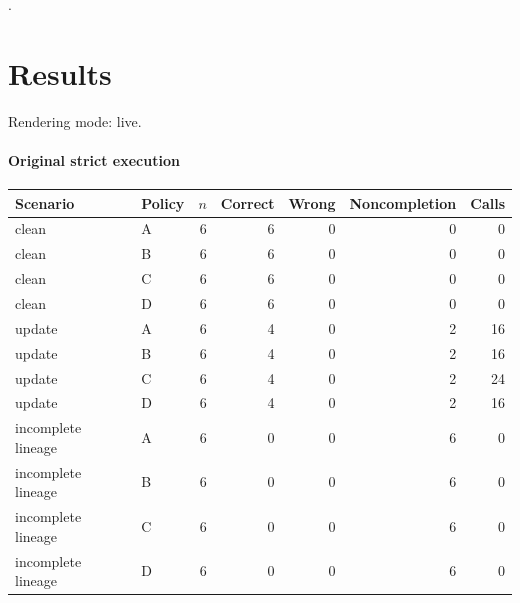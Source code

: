 \documentclass{article}
\begin{document}
\citep{ref0002,ref0001}.

\section{Results}

Rendering mode: live. 

\noindent\begin{minipage}{\linewidth}

\paragraph{Original strict execution}

\begin{center}

{\footnotesize\setlength{\tabcolsep}{3pt}\begin{tabular}{llrrrrr}\hline

Scenario & Policy & $n$ & Correct & Wrong & Noncompletion & Calls \\\hline

clean & A & 6 & 6 & 0 & 0 & 0 \\

clean & B & 6 & 6 & 0 & 0 & 0 \\

clean & C & 6 & 6 & 0 & 0 & 0 \\

clean & D & 6 & 6 & 0 & 0 & 0 \\

update & A & 6 & 4 & 0 & 2 & 16 \\

update & B & 6 & 4 & 0 & 2 & 16 \\

update & C & 6 & 4 & 0 & 2 & 24 \\

update & D & 6 & 4 & 0 & 2 & 16 \\

incomplete lineage & A & 6 & 0 & 0 & 6 & 0 \\

incomplete lineage & B & 6 & 0 & 0 & 6 & 0 \\

incomplete lineage & C & 6 & 0 & 0 & 6 & 0 \\

incomplete lineage & D & 6 & 0 & 0 & 6 & 0 \\

\hline\end{tabular}}\end{center}\end{minipage}\par\medskip
\end{document}
